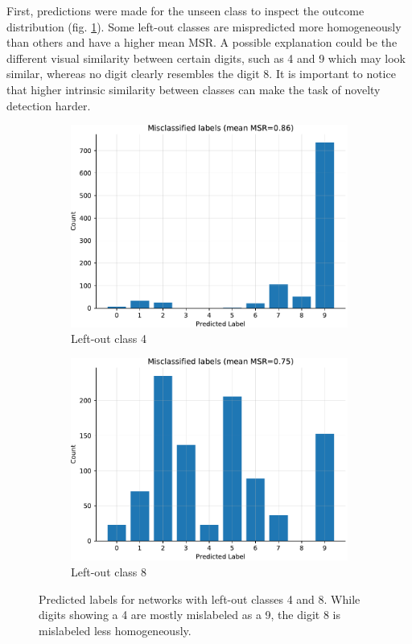 \documentclass[10pt]{article}
\begin{document}
First, predictions were made for the unseen class to inspect the outcome distribution (fig. \ref{fig:pred-count-mnist}). Some left-out classes are mispredicted more homogeneously than others and have a higher mean \gls{MSR}. A possible explanation could be the different visual similarity between certain digits, such as 4 and 9 which may look similar, whereas no digit clearly resembles the digit 8. It is important to notice that higher intrinsic similarity between classes can make the task of novelty detection harder.

\begin{figure}[H]
    \begin{subfigure}{.49\textwidth}
        \centering
        \includegraphics[width=\textwidth]{pred-count_wo_cl4}
        \caption{Left-out class 4}
    \end{subfigure}
    \begin{subfigure}{.5\textwidth}
        \centering
        \includegraphics[width=\textwidth]{pred-count_wo_cl8}
        \caption{Left-out class 8}
    \end{subfigure}
    \caption{Predicted labels for networks with left-out classes 4 and 8. While digits showing a 4 are mostly mislabeled as a 9, the digit 8 is mislabeled less homogeneously.}
    \label{fig:pred-count-mnist}
\end{figure} 
\end{document}
